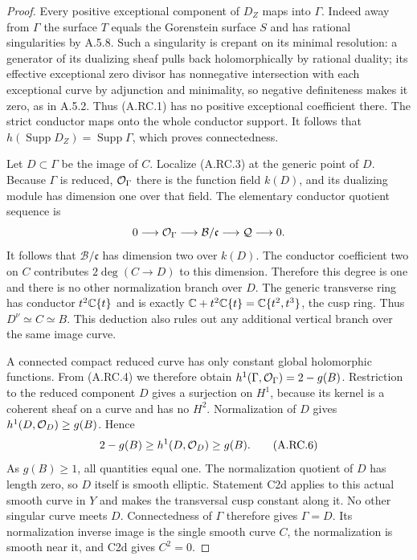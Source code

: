 \begin{proof}
Every positive exceptional component of $D_Z$ maps into
$\Gamma$. Indeed away from $\Gamma$ the surface $T$ equals
the Gorenstein surface $S$ and has rational singularities by
A.5.8. Such a singularity is crepant on its minimal resolution:
a generator of its dualizing sheaf pulls back holomorphically
by rational duality; its effective exceptional zero divisor
has nonnegative intersection with each exceptional curve by
adjunction and minimality, so negative definiteness makes it
zero, as in A.5.2. Thus (A.RC.1) has no positive exceptional
coefficient there. The strict conductor maps onto the whole
conductor support. It follows that
$h(\operatorname{Supp}D_Z)=\operatorname{Supp}\Gamma$,
which proves connectedness.

Let $D\subset\Gamma$ be the image of $C$. Localize (A.RC.3)
at the generic point of $D$. Because $\Gamma$ is reduced,
$\mathcal O_\Gamma$ there is the function field $k(D)$, and its
dualizing module has dimension one over that field. The
elementary conductor quotient sequence is
\[
 0\longrightarrow\mathcal O_\Gamma\longrightarrow
          \mathcal B/\mathfrak c
   \longrightarrow\mathcal Q\longrightarrow0.
\]
It follows that $\mathcal B/\mathfrak c$ has dimension two
over $k(D)$. The conductor coefficient two on $C$ contributes
$2\deg(C\to D)$ to this dimension. Therefore this degree is
one and there is no other normalization branch over $D$.
The generic transverse ring has conductor $t^2\mathbb C\{t\}$ and
is exactly $\mathbb C+t^2\mathbb C\{t\}=\mathbb C\{t^2,t^3\}$, the cusp ring.
Thus $D^\nu\simeq C\simeq B$. This deduction also rules out
any additional vertical branch over the same image curve.

A connected compact reduced curve has only constant global
holomorphic functions. From (A.RC.4) we therefore obtain
$h^1(\Gamma,\mathcal O_\Gamma)=2-g(B)$.
Restriction to the reduced component $D$ gives a surjection
on $H^1$, because its kernel is a coherent sheaf on a curve
and has no $H^2$. Normalization of $D$ gives
$h^1(D,\mathcal O_D)\ge g(B)$. Hence
\[
             2-g(B)\ge h^1(D,\mathcal O_D)\ge g(B).         \tag{A.RC.6}
\]
As $g(B)\ge1$, all quantities equal one. The normalization
quotient of $D$ has length zero, so $D$ itself is smooth
elliptic. Statement C2d applies to this actual smooth curve
in $Y$ and makes the transversal cusp constant along it.
No other singular curve meets $D$. Connectedness of $\Gamma$
therefore gives $\Gamma=D$. Its normalization inverse image
is the single smooth curve $C$, the normalization is smooth
near it, and C2d gives $C^2=0$.


\end{proof}
